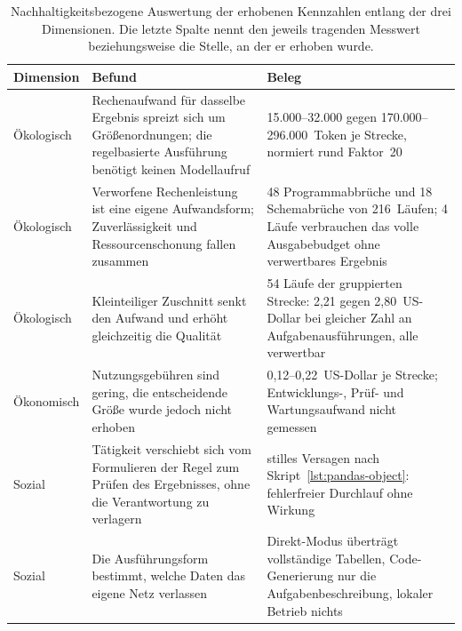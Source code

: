 \begin{table}[htbp]
    \centering
    \small
    \caption[Nachhaltigkeitsbezogene Befunde]{Nachhaltigkeitsbezogene Auswertung der erhobenen Kennzahlen entlang der drei Dimensionen. Die letzte Spalte nennt den jeweils tragenden Messwert beziehungsweise die Stelle, an der er erhoben wurde.}
    \label{tab:nachhaltigkeit}
    \begin{tabularx}{\textwidth}{@{}p{2.6cm}XX@{}}
        \toprule
        \textbf{Dimension} & \textbf{Befund} & \textbf{Beleg} \\
        \midrule
        Ökologisch & Rechenaufwand für dasselbe Ergebnis spreizt sich um Größenordnungen; die regelbasierte Ausführung benötigt keinen Modellaufruf & 15.000--32.000 gegen 170.000--296.000~Token je Strecke, normiert rund Faktor~20 \\
        \addlinespace
        Ökologisch & Verworfene Rechenleistung ist eine eigene Aufwandsform; Zuverlässigkeit und Ressourcenschonung fallen zusammen & 48 Programmabbrüche und 18 Schema\-brüche von 216~Läufen; 4 Läufe verbrauchen das volle Ausgabebudget ohne verwertbares Ergebnis \\
        \addlinespace
        Ökologisch & Kleinteiliger Zuschnitt senkt den Aufwand und erhöht gleichzeitig die Qualität & 54 Läufe der gruppierten Strecke: 2,21 gegen 2,80~US-Dollar bei gleicher Zahl an Aufgabenausführungen, alle verwertbar \\
        \addlinespace
        Ökonomisch & Nutzungsgebühren sind gering, die entscheidende Größe wurde jedoch nicht erhoben & 0,12--0,22~US-Dollar je Strecke; Entwicklungs-, Prüf- und Wartungsaufwand nicht gemessen \\
        \addlinespace
        Sozial & Tätigkeit verschiebt sich vom Formulieren der Regel zum Prüfen des Ergebnisses, ohne die Verantwortung zu verlagern & stilles Versagen nach Skript~\ref{lst:pandas-object}: fehlerfreier Durchlauf ohne Wirkung \\
        \addlinespace
        Sozial & Die Ausführungsform bestimmt, welche Daten das eigene Netz verlassen & Direkt-Modus überträgt vollständige Tabellen, Code-Generierung nur die Aufgabenbeschreibung, lokaler Betrieb nichts \\
        \bottomrule
    \end{tabularx}
\end{table}

